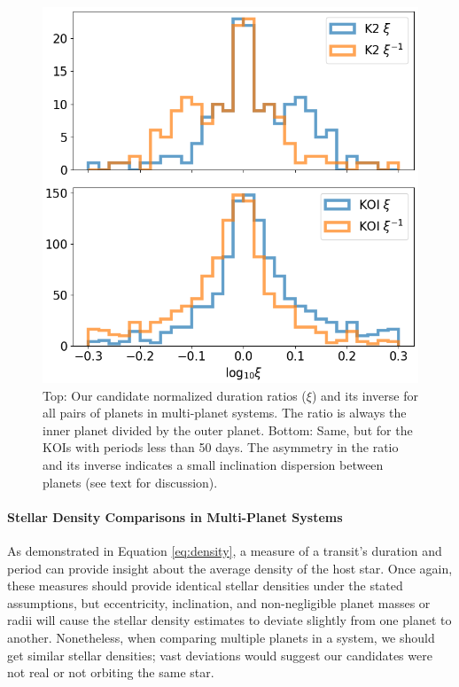 \documentclass[twocolumn]{aastex62}
\begin{document}
\begin{figure}[tbp]
\includegraphics[width=\columnwidth]{normed_duration.png}
\caption{Top: Our candidate normalized duration ratios ($\xi$) and its
  inverse for all pairs of planets in multi-planet systems. The ratio
  is always the inner planet divided by the outer planet. Bottom:
  Same, but for the KOIs with periods less than 50 days. The asymmetry
  in the ratio and its inverse indicates a small inclination
  dispersion between planets (see text for discussion).
\label{normed_duration}}
\end{figure}


\paragraph{Stellar Density Comparisons in Multi-Planet Systems}

As demonstrated in Equation \ref{eq:density}, a measure of a transit's
duration and period can provide insight about the average density of
the host star.  Once again, these measures should provide identical
stellar densities under the stated assumptions, but eccentricity,
inclination, and non-negligible planet masses or radii will cause the
stellar density estimates to deviate slightly from one planet to
another. Nonetheless, when comparing multiple planets in a system, we
should get similar stellar densities; vast deviations would suggest
our candidates were not real or not orbiting the same star.
\end{document}
